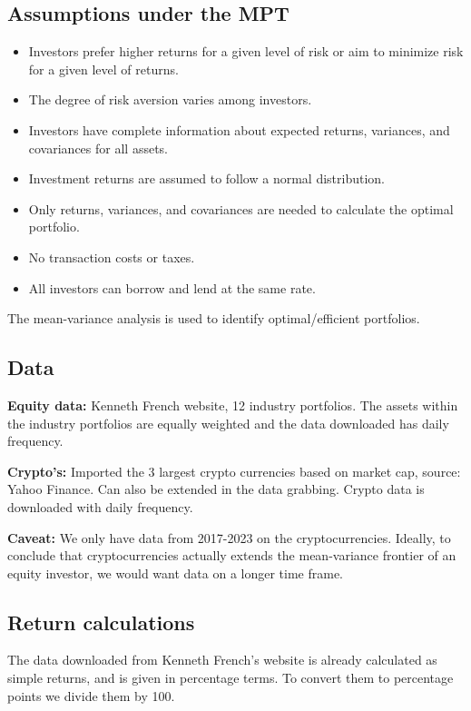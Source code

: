 \documentclass[12pt,a4paper]{article}
\begin{document}
\subsection{Assumptions under the MPT}
\begin{itemize}
\item Investors prefer higher returns for a given level of risk or aim to minimize risk for a given level of returns.
\item The degree of risk aversion varies among investors.
\item Investors have complete information about expected returns, variances, and covariances for all assets.
\item Investment returns are assumed to follow a normal distribution.
\item Only returns, variances, and covariances are needed to calculate the optimal portfolio.
\item No transaction costs or taxes.
\item All investors can borrow and lend at the same rate. 
\end{itemize}
The mean-variance analysis is used to identify optimal/efficient portfolios.

\subsection{Data}
\textbf{Equity data:} Kenneth French website, 12 industry portfolios. The assets within the industry portfolios are equally 
weighted and the data downloaded has daily frequency. 

\noindent\textbf{Crypto's:} Imported the 3 largest crypto currencies based on market cap, source: Yahoo Finance. Can also be 
extended in the data grabbing. Crypto data is downloaded with daily frequency.  

\noindent \textbf{Caveat:} We only have data from 2017-2023 on the cryptocurrencies. Ideally, to conclude that cryptocurrencies 
actually extends the mean-variance frontier of an equity investor, we would want data on a longer time frame.    

\subsection{Return calculations}
The data downloaded from Kenneth French's website is already calculated as simple returns, and is given in percentage terms. 
To convert them to percentage points we divide them by 100.  
\end{document}
